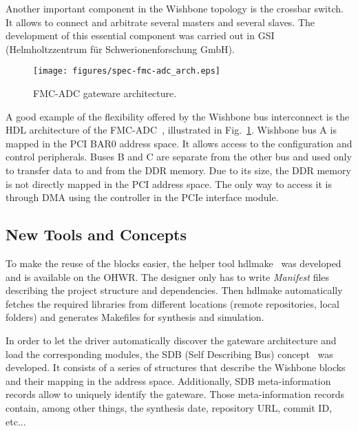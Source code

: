 \documentclass{JAC2003}
\begin{document}
Another important component in the Wishbone topology is the crossbar switch.
It allows to connect and arbitrate several masters and several slaves.
The development of this essential component was carried out in GSI (Helmholtzzentrum f\"ur Schwerionenforschung GmbH).

\begin{figure}[htb]
   \centering
   \texttt{[image: figures/spec-fmc-adc\_arch.eps]}
   \caption{FMC-ADC gateware architecture.}
   \label{spec-fmc-adc_arch}
\end{figure}

A good example of the flexibility offered by the Wishbone bus interconnect is the HDL architecture of the FMC-ADC~\cite{fmc-adc}, illustrated in Fig.~\ref{spec-fmc-adc_arch}.
Wishbone bus A is mapped in the PCI BAR0 address space.
It allows access to the configuration and control peripherals.
Buses B and C are separate from the other bus and used only to transfer data to and from the DDR memory.
Due to its size, the DDR memory is not directly mapped in the PCI address space.
The only way to access it is through DMA using the controller in the PCIe interface module.

\subsection{New Tools and Concepts}

To make the reuse of the blocks easier, the helper tool hdlmake~\cite{hdlmake} was developed and is available on the OHWR.
The designer only has to write \textit{Manifest} files describing the project structure and dependencies.
Then hdlmake automatically fetches the required libraries from different locations (remote repositories, local folders) and generates Makefiles for synthesis and simulation.

In order to let the driver automatically discover the gateware architecture and load the corresponding modules, the SDB (Self Describing Bus) concept~\cite{sdb} was developed.
It consists of a series of structures that describe the Wishbone blocks and their mapping in the address space.
Additionally, SDB meta-information records allow to uniquely identify the gateware.
Those meta-information records contain, among other things, the synthesis date, repository URL, commit ID, etc...
\end{document}
